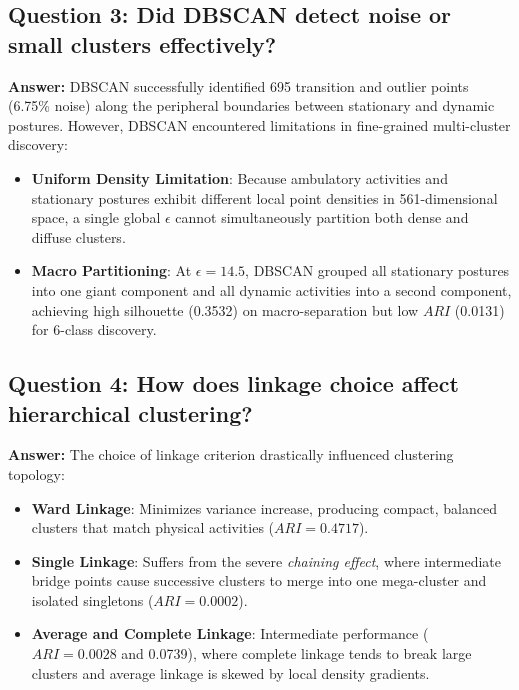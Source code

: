 \documentclass[12pt,a4paper]{article}
\begin{document}
\subsection*{Question 3: Did DBSCAN detect noise or small clusters effectively?}
\textbf{Answer:} DBSCAN successfully identified 695 transition and outlier points (6.75\% noise) along the peripheral boundaries between stationary and dynamic postures. However, DBSCAN encountered limitations in fine-grained multi-cluster discovery:
\begin{itemize}
\item \textbf{Uniform Density Limitation}: Because ambulatory activities and stationary postures exhibit different local point densities in 561-dimensional space, a single global $\epsilon$ cannot simultaneously partition both dense and diffuse clusters.
\item \textbf{Macro Partitioning}: At $\epsilon = 14.5$, DBSCAN grouped all stationary postures into one giant component and all dynamic activities into a second component, achieving high silhouette (0.3532) on macro-separation but low $ARI$ (0.0131) for 6-class discovery.
\end{itemize}

\subsection*{Question 4: How does linkage choice affect hierarchical clustering?}
\textbf{Answer:} The choice of linkage criterion drastically influenced clustering topology:
\begin{itemize}
\item \textbf{Ward Linkage}: Minimizes variance increase, producing compact, balanced clusters that match physical activities ($ARI = 0.4717$).
\item \textbf{Single Linkage}: Suffers from the severe \textit{chaining effect}, where intermediate bridge points cause successive clusters to merge into one mega-cluster and isolated singletons ($ARI = 0.0002$).
\item \textbf{Average and Complete Linkage}: Intermediate performance ($ARI = 0.0028$ and 0.0739), where complete linkage tends to break large clusters and average linkage is skewed by local density gradients.
\end{itemize}
\end{document}
